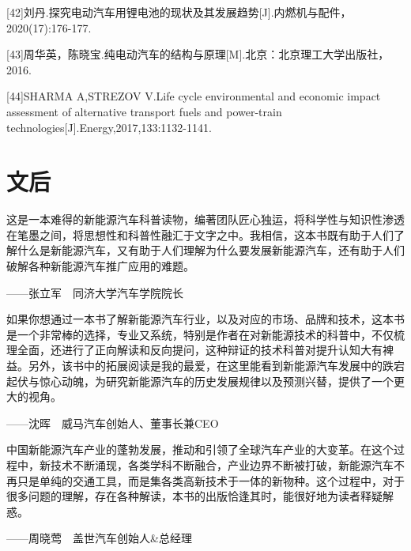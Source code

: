 \documentclass[12pt,UTF8]{ctexbook}
\begin{document}
[42]刘丹.探究电动汽车用锂电池的现状及其发展趋势[J].内燃机与配件，2020(17):176-177.

[43]周华英，陈晓宝.纯电动汽车的结构与原理[M].北京：北京理工大学出版社，2016.

[44]SHARMA A,STREZOV V.Life cycle environmental and economic impact assessment of alternative transport fuels and power-train technologies[J].Energy,2017,133:1132-1141.

\chapter{文后}

这是一本难得的新能源汽车科普读物，编著团队匠心独运，将科学性与知识性渗透在笔墨之间，将思想性和科普性融汇于文字之中。我相信，这本书既有助于人们了解什么是新能源汽车，又有助于人们理解为什么要发展新能源汽车，还有助于人们破解各种新能源汽车推广应用的难题。

\hfill——张立军　同济大学汽车学院院长

如果你想通过一本书了解新能源汽车行业，以及对应的市场、品牌和技术，这本书是一个非常棒的选择，专业又系统，特别是作者在对新能源技术的科普中，不仅梳理全面，还进行了正向解读和反向提问，这种辩证的技术科普对提升认知大有裨益。另外，该书中的拓展阅读是我的最爱，在这里能看到新能源汽车发展中的跌宕起伏与惊心动魄，为研究新能源汽车的历史发展规律以及预测兴替，提供了一个更大的视角。

\hfill——沈晖　威马汽车创始人、董事长兼CEO

中国新能源汽车产业的蓬勃发展，推动和引领了全球汽车产业的大变革。在这个过程中，新技术不断涌现，各类学科不断融合，产业边界不断被打破，新能源汽车不再只是单纯的交通工具，而是集各类高新技术于一体的新物种。这个过程中，对于很多问题的理解，存在各种解读，本书的出版恰逢其时，能很好地为读者释疑解惑。

\hfill——周晓莺　盖世汽车创始人\&总经理
\end{document}
